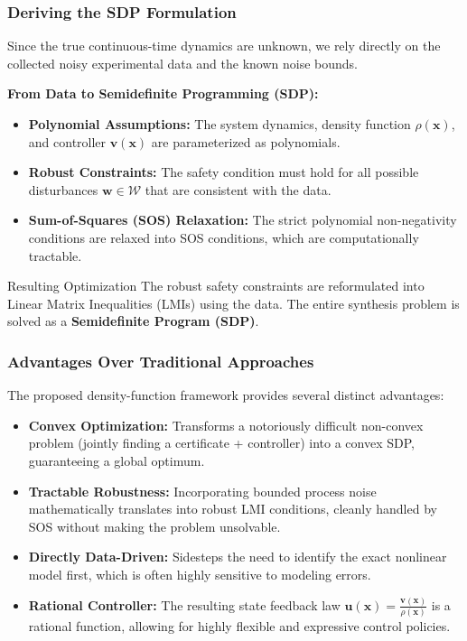 \documentclass[8pt, hyperref={bookmarks=false},aspectratio=169, xcolor=table]{beamer}
\begin{document}
\begin{frame}\frametitle{Deriving the SDP Formulation}
  Since the true continuous-time dynamics are unknown, we rely directly on the collected noisy experimental data and the known noise bounds.

  \vspace{0.3cm}
  \textbf{From Data to Semidefinite Programming (SDP):}
  \begin{itemize}
    \item \textbf{Polynomial Assumptions:} The system dynamics, density function $\rho(\mathbf{x})$, and controller $\mathbf{v}(\mathbf{x})$ are parameterized as polynomials.
    \item \textbf{Robust Constraints:} The safety condition must hold for all possible disturbances $\mathbf{w} \in \mathcal{W}$ that are consistent with the data.
    \item \textbf{Sum-of-Squares (SOS) Relaxation:} The strict polynomial non-negativity conditions are relaxed into SOS conditions, which are computationally tractable.
  \end{itemize}

  \vspace{0.2cm}
  \begin{block}{Resulting Optimization}
    The robust safety constraints are reformulated into Linear Matrix Inequalities (LMIs) using the data. The entire synthesis problem is solved as a \textbf{Semidefinite Program (SDP)}.
  \end{block}
\end{frame}

\begin{frame}\frametitle{Advantages Over Traditional Approaches}
  The proposed density-function framework provides several distinct advantages:

  \vspace{0.3cm}
  \begin{itemize}
    \item \textbf{Convex Optimization:} Transforms a notoriously difficult non-convex problem (jointly finding a certificate + controller) into a convex SDP, guaranteeing a global optimum.
    \item \textbf{Tractable Robustness:} Incorporating bounded process noise mathematically translates into robust LMI conditions, cleanly handled by SOS without making the problem unsolvable.
    \item \textbf{Directly Data-Driven:} Sidesteps the need to identify the exact nonlinear model first, which is often highly sensitive to modeling errors.
    \item \textbf{Rational Controller:} The resulting state feedback law $\mathbf{u}(\mathbf{x}) = \frac{\mathbf{v}(\mathbf{x})}{\rho(\mathbf{x})}$ is a rational function, allowing for highly flexible and expressive control policies.
  \end{itemize}
\end{frame}
\end{document}
